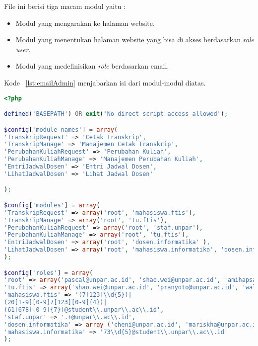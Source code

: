 File ini berisi tiga macam modul yaitu :
\begin{itemize}
	\item Modul yang mengarakan ke halaman website.
	\item Modul yang menentukan halaman website yang bisa di akses berdasarkan \textit{role user}.
	\item Modul yang medefinisikan \textit{role} berdasarkan email.
\end{itemize}
Kode ~\ref{lst:emailAdmin} menjabarkan isi dari modul-modul diatas.
\begin{lstlisting}[style=customphp, language=PHP, basicstyle=\ttfamily, frame=single, columns=fullflexible, keepspaces=true, breaklines=true, showstringspaces=false, label={lst:emailAdmin}, caption=Sunting akses email]
<?php

defined('BASEPATH') OR exit('No direct script access allowed');

$config['module-names'] = array(
'TranskripRequest' => 'Cetak Transkrip',
'TranskripManage' => 'Manajemen Cetak Transkrip',
'PerubahanKuliahRequest' => 'Perubahan Kuliah',
'PerubahanKuliahManage' => 'Manajemen Perubahan Kuliah',
'EntriJadwalDosen' => 'Entri Jadwal Dosen',
'LihatJadwalDosen' => 'Lihat Jadwal Dosen'

);

$config['modules'] = array(
'TranskripRequest' => array('root', 'mahasiswa.ftis'),
'TranskripManage' => array('root', 'tu.ftis'),
'PerubahanKuliahRequest' => array('root', 'staf.unpar'),
'PerubahanKuliahManage' => array('root', 'tu.ftis'),
'EntriJadwalDosen' => array('root', 'dosen.informatika' ),
'LihatJadwalDosen' => array('root', 'mahasiswa.informatika', 'dosen.informatika')
);

$config['roles'] = array(
'root' => array('pascal@unpar.ac.id', 'shao.wei@unpar.ac.id', 'amihapsahapsa@gmail.com'),
'tu.ftis' => array('shao.wei@unpar.ac.id', 'pranyoto@unpar.ac.id', 'walip@unpar.ac.id', 'dwina@unpar.ac.id'),
'mahasiswa.ftis' => '(7[123]\\d{5})|
(20[1-9][0-9]7[123][0-9]{4})|
(61[678][0-9]{7})@student\\.unpar\\.ac\\.id',
'staf.unpar' => '.+@unpar\\.ac\\.id',
'dosen.informatika' => array ('cheni@unpar.ac.id', 'mariskha@unpar.ac.id', 'anung@unpar.ac.id', 'moertini@unpar.ac.id', 'natalia@unpar.ac.id', 'chandraw@unpar.ac.id', 'elisatih@unpar.ac.id', 'gkarya@unpar.ac.id', 'husnulhakim@unpar.ac.id', 'joanna@unpar.ac.id', 'lionov@unpar.ac.id', 'luciana@unpar.ac.id', 'pascal@unpar.ac.id', 'rosad5@unpar.ac.id', 'vania.natali@unpar.ac.id', 'kristopher.h@unpar.ac.id', 'raymond.chandra@unpar.ac.id', 'keenan.leman@unpar.ac.id'),
'mahasiswa.informatika' => '73\\d{5}@student\\.unpar\\.ac\\.id'
);
\end{lstlisting}

